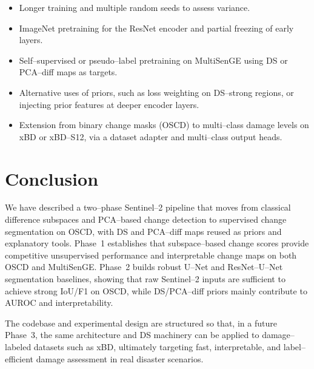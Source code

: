 \documentclass[twoside,11pt]{article}
\begin{document}
\begin{itemize}
  \item Longer training and multiple random seeds to assess variance.
  \item ImageNet pretraining for the ResNet encoder and partial freezing of
  early layers.
  \item Self--supervised or pseudo--label pretraining on MultiSenGE using DS
  or PCA--diff maps as targets.
  \item Alternative uses of priors, such as loss weighting on DS--strong
  regions, or injecting prior features at deeper encoder layers.
  \item Extension from binary change masks (OSCD) to multi--class damage
  levels on xBD or xBD--S12, via a dataset adapter and multi--class output
  heads.
\end{itemize}

\section{Conclusion}

We have described a two--phase Sentinel--2 pipeline that moves from classical
difference subspaces and PCA--based change detection to supervised change
segmentation on OSCD, with DS and PCA--diff maps reused as priors and
explanatory tools. Phase~1 establishes that subspace--based change scores
provide competitive unsupervised performance and interpretable change maps
on both OSCD and MultiSenGE. Phase~2 builds robust U--Net and ResNet--U--Net
segmentation baselines, showing that raw Sentinel--2 inputs are sufficient to
achieve strong IoU/F1 on OSCD, while DS/PCA--diff priors mainly contribute to
AUROC and interpretability.

The codebase and experimental design are structured so that, in a future
Phase~3, the same architecture and DS machinery can be applied to
damage--labeled datasets such as xBD, ultimately targeting fast, interpretable,
and label--efficient damage assessment in real disaster scenarios.
\end{document}
